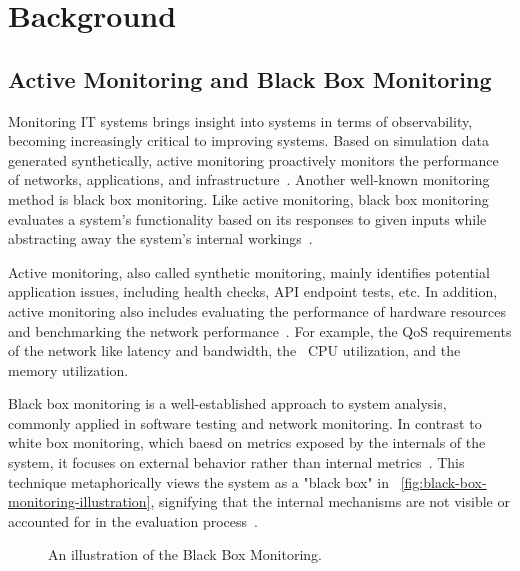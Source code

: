 \usetikzlibrary{positioning,fit,calc,arrows,shapes}

\chapter{Background}\label{chapter:background}

\section{Active Monitoring and Black Box Monitoring}

Monitoring IT systems brings insight into systems in terms of observability, becoming increasingly critical to improving systems. Based on simulation data generated synthetically, active monitoring proactively monitors the performance of networks, applications, and infrastructure~\parencite{splunkActiveVsPassive2023}. Another well-known monitoring method is black box monitoring. Like active monitoring, black box monitoring evaluates a system's functionality based on its responses to given inputs while abstracting away the system's internal workings~\parencite{jorgensenSoftwareTestingCraftsman2021}. 

Active monitoring, also called synthetic monitoring, mainly identifies potential application issues, including health checks, \ac{API} endpoint tests, etc. In addition, active monitoring also includes evaluating the performance of hardware resources and benchmarking the network performance~\parencite{splunkActiveVsPassive2023}. For example, the \ac{QoS} requirements of the network like latency and bandwidth, the ~\ac{CPU} utilization, and the memory utilization. 

Black box monitoring is a well-established approach to system analysis, commonly applied in software testing and network monitoring. In contrast to white box monitoring, which baesd on metrics exposed by the internals of the system, it focuses on external behavior rather than internal metrics~\parencite{beyerSiteReliabilityEngineering2016}. This technique metaphorically views the system as a "black box" in ~\autoref{fig:black-box-monitoring-illustration}, signifying that the internal mechanisms are not visible or accounted for in the evaluation process~\parencite{myersArtSoftwareTesting2004}. 

\begin{figure}[htpb]
    \centering
    \caption[Black Box Monitoring Illustration]{An illustration of the Black Box Monitoring.}\label{fig:black-box-monitoring-illustration}
\end{figure}

